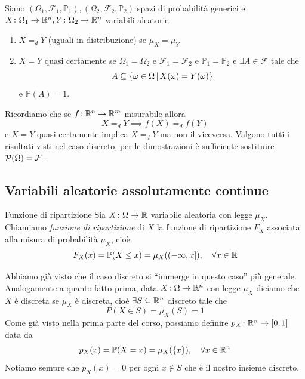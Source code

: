 \documentclass[a4paper]{article}
\begin{document}
\begin{snippetdefinition}{}
    Siano \((\Omega_1, \mathcal F_1, \mathbb P_1), (\Omega_2, \mathcal F_2, \mathbb P_2)\)
    spazi di probabilità generici e \(X \colon \Omega_1 \to \mathbb{R}^n, Y \colon \Omega_2 \to \mathbb{R}^n\)
    variabili aleatorie.
    \begin{enumerate}
        \item \(X =_d Y\) (uguali in distribuzione) se \(\mu_X = \mu_Y\)
            \item \(X = Y\) quasi certamente se \(\Omega_1 = \Omega_2\)
            e \(\mathcal F_1 = \mathcal F_2\) e \(\mathbb P_1 = \mathbb P_2\) e
            \(\exists A \in \mathcal F\) tale che \[
                A \subseteq \left\{
                    \omega \in \Omega \,|\, X(\omega) = Y(\omega)
                \right\}
            \]
            e \(\mathbb P(A) = 1\).
    \end{enumerate}
\end{snippetdefinition}

Ricordiamo che se \(f \colon \mathbb{R}^n \to \mathbb{R}^m\)
misurabile allora \[
    X =_d Y \implies f(X) =_d f(Y)
\]
e \(X=Y\) quasi certamente implica \(X=_d Y\) ma non il viceversa.
Valgono tutti i risultati visti
nel caso discreto, per le dimostrazioni è sufficiente
sostituire \(\mathcal P(\Omega) = \mathcal F\).

\subsection{Variabili aleatorie assolutamente continue}

\begin{snippetdefinition}{Funzione di ripartizione}
    Sia \(X \colon \Omega \to \mathbb{R}\) variabile aleatoria con legge \(\mu_X\).
    Chiamiamo \emph{funzione di ripartizione} di \(X\) la funzione di ripartizione
    \(F_X\) associata alla misura di probabilità \(\mu_X\), cioè \[
        F_X(x) = \mathbb P(X \leq x) = \mu_X((-\infty, x]), \quad \forall x \in \mathbb{R}
    \]
\end{snippetdefinition}

Abbiamo già visto che il caso discreto
si ``immerge in questo caso'' più generale.
Analogamente a quanto fatto prima, data \(X \colon \Omega \to \mathbb{R}^n\)
con legge \(\mu_X\) diciamo che \(X\) è discreta se \(\mu_X\) è discreta, cioè
\(\exists S \subseteq \mathbb{R}^n\) discreto tale che \[
    P(X \in S) = \mu_X(S) = 1
\]
Come già visto nella prima parte del corso,
possiamo definire \(p_X \colon \mathbb{R}^n \to [0,1]\)
data da \[
    p_X(x) = \mathbb P(X=x) = \mu_X(\{x\}), \quad \forall x \in \mathbb{R}^n
\]
Notiamo sempre che \(p_X(x) = 0\) per ogni \(x \notin S\) che è il nostro insieme discreto.
\end{document}
